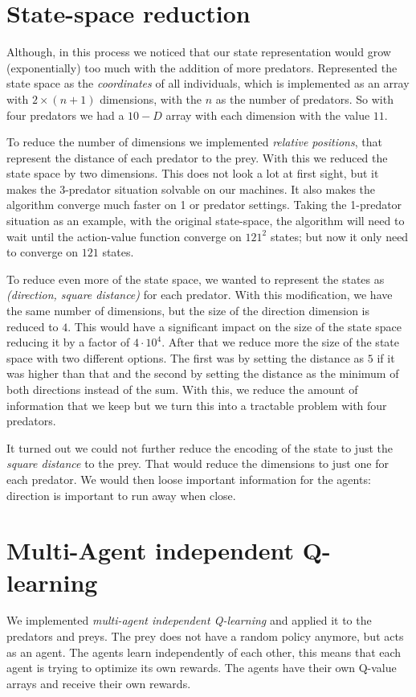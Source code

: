 \documentclass{article}
\begin{document}
\section{State-space reduction}
Although, in this process we noticed that our state representation would grow
(exponentially) too much with the addition of more predators. Represented the
state space as the \emph{coordinates} of all individuals, which is implemented as
an array with $2 \times (n+1)$ dimensions, with the $n$ as the number of
predators. So with four predators we had a $10-D$ array with each dimension
with the value $11$.

To reduce the number of dimensions we implemented \emph{relative positions},
that represent the distance of each predator to the prey. With this we reduced the
state space by two dimensions. This does not look a lot at first sight, but it makes the 3-predator situation solvable on our machines. It also makes the algorithm converge much faster on 1 or predator settings. Taking the 1-predator situation as an example, with the original state-space, the algorithm will need to wait until the action-value function converge on $121^2$ states; but now it only need to converge on $121$ states.

To reduce even more of the state space, we wanted to represent the states as
\emph{(direction, square distance)} for each predator. With this modification, we have the
same number of dimensions, but the size of the direction dimension is reduced to $4$.
This would have a significant impact on the size of the state space reducing it
by a factor of $4\cdot10^4$. After that we reduce more the size of the state space with
two different options. The first was by setting the distance as $5$ if it was
higher than that and the second by setting the distance as the minimum of both
directions instead of the sum.
With this, we reduce the amount of information that we keep but we turn this into
a tractable problem with four predators.

It turned out we could not further reduce the encoding of the state to just the \emph{square distance} to the prey. That
would reduce the dimensions to just one for each predator. We would then loose important information for the agents: direction is important to run away
when close.

\section{Multi-Agent independent Q-learning}
We implemented \emph{multi-agent independent Q-learning} and applied it to the predators and preys. The prey does not have a random policy anymore, but acts as an agent. The agents learn
independently of each other, this means that each agent is trying to optimize
its own rewards. The agents have their own Q-value arrays and receive their own rewards.
\end{document}
